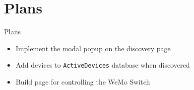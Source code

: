 \documentclass{beamer}
\begin{document}
\section{Plans}
\begin{frame}{Plans}{}
\begin{itemize}
\item Implement the modal popup on the discovery page
\item Add devices to \texttt{ActiveDevices} database when discovered
\item Build page for controlling the WeMo Switch
\end{itemize}
\end{frame}
\end{document}
